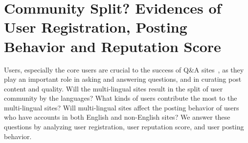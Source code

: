 \section{Community Split? Evidences of User Registration, Posting Behavior and Reputation Score}

Users, especially the core users are crucial to the success of Q\&A sites~\cite{mamykina2011design}, as they play an important role in asking and answering questions, and in curating post content and quality.
Will the multi-lingual sites result in the split of user community by the languages?
What kinds of users contribute the most to the multi-lingual sites?
Will multi-lingual sites affect the posting behavior of users who have accounts in both English and non-English sites?
We answer these questions by analyzing user registration, user reputation score, and user posting behavior.


